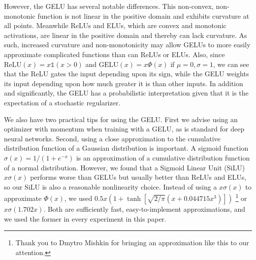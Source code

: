 \documentclass{article}
\begin{document}
However, the GELU has several notable differences. This non-convex, non-monotonic function is not linear in the positive domain and exhibits curvature at all points. Meanwhile ReLUs and ELUs, which are convex and monotonic activations, are linear in the positive domain and thereby can lack curvature. As such, increased curvature and non-monotonicity may allow GELUs to more easily approximate complicated functions than can ReLUs or ELUs. Also, since $\text{ReLU}(x)=x\mathds{1}(x>0)$ and $\text{GELU}(x)=x\Phi(x)$ if $\mu=0,\sigma=1$, we can see that the ReLU gates the input depending upon its sign, while the GELU weights its input depending upon how much greater it is than other inputs. In addition and significantly, the GELU has a probabilistic interpretation given that it is the expectation of a stochastic regularizer.



We also have two practical tips for using the GELU. First we advise using an optimizer with momentum when training with a GELU, as is standard for deep neural networks. Second, using a close approximation to the cumulative distribution function of a Gaussian distribution is important. A sigmoid function $\sigma(x)=1/(1+e^{-x})$ is an approximation of a cumulative distribution function of a normal distribution. However, we found that a Sigmoid Linear Unit (SiLU) $x\sigma(x)$ performs worse than GELUs but usually better than ReLUs and ELUs, so our SiLU is also a reasonable nonlinearity choice. Instead of using a $x\sigma(x)$ to approximate $\Phi(x)$, we used $0.5x (1 + \tanh[\sqrt{2/\pi}(x + 0.044715x^3)])$ \citep{approx}\footnote{Thank you to Dmytro Mishkin for bringing an approximation like this to our attention.} or $x \sigma(1.702 x)$. Both are sufficiently fast, easy-to-implement approximations, and we used the former in every experiment in this paper.
\end{document}

